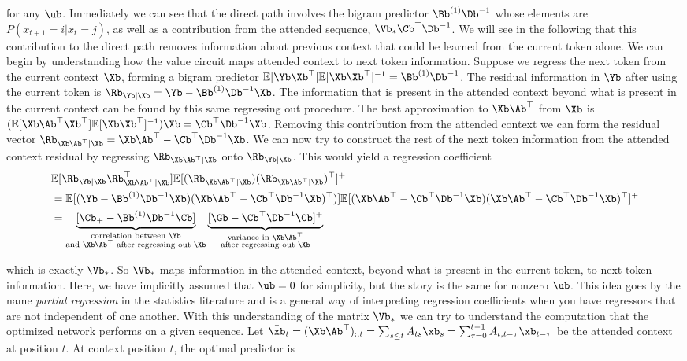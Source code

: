 \documentclass{article}
\begin{document}
for any $\ub$. Immediately we can see that the direct path involves the bigram predictor $\Bb^{(1)}\Db^{-1}$ whose elements are $P(x_{t+1} = i | x_t = j)$, as well as a contribution from the attended sequence, $\Vb_* \Cb^\top \Db^{-1}$. We will see in the following that this contribution to the direct path removes information about previous context that could be learned from the current token alone. We can begin by understanding how the value circuit maps attended context to next token information. Suppose we regress the next token from the current context $\Xb$, forming a bigram predictor $\mathbb{E}[\Yb\Xb^\top]\mathbb{E}[\Xb\Xb^\top]^{-1} = \Bb^{(1)}\Db^{-1}$. The residual information in $\Yb$ after using the current token is $\Rb_{\Yb|\Xb} = \Yb - \Bb^{(1)}\Db^{-1}\Xb$. The information that is present in the attended context beyond what is present in the current context can be found by this same regressing out procedure. The best approximation to $\Xb \Ab^\top$ from $\Xb$ is $(\mathbb{E}[\Xb\Ab^\top\Xb^\top]\mathbb{E}[\Xb\Xb^\top]^{-1})\Xb = \Cb^\top \Db^{-1}\Xb$. Removing this contribution from the attended context we can form the residual vector $\Rb_{\Xb \Ab^\top | \Xb} = \Xb\Ab^\top - \Cb^\top\Db^{-1}\Xb$. We can now try to construct the rest of the next token information from the attended context residual by regressing $\Rb_{\Xb \Ab^\top | \Xb}$ onto $\Rb_{\Yb|\Xb}$. This would yield a regression coefficient 
\begin{align}
    &\mathbb{E}[\Rb_{\Yb|\Xb}\Rb_{\Xb \Ab^\top | \Xb}^\top]\mathbb{E}[(\Rb_{\Xb \Ab^\top | \Xb})(\Rb_{\Xb \Ab^\top | \Xb})^\top]^{+}\\
    &= \mathbb{E}[(\Yb - \Bb^{(1)}\Db^{-1}\Xb)(\Xb\Ab^\top - \Cb^\top\Db^{-1}\Xb)^\top)]\mathbb{E}[(\Xb\Ab^\top - \Cb^\top\Db^{-1}\Xb)(\Xb\Ab^\top - \Cb^\top\Db^{-1}\Xb)^\top]^{+} \\
    &= \underbrace{[\Cb_+ - \Bb^{(1)}\Db^{-1}\Cb]}_{\substack{\textrm{correlation between $\Yb$} \\ \textrm{and $\Xb\Ab^\top$ after regressing out $\Xb$}}}\underbrace{[\Gb - \Cb^\top \Db^{-1}\Cb]^{+}}_{\substack{\textrm{variance in $\Xb\Ab^\top$} \\ \textrm{after regressing out $\Xb$}}}
\end{align}

which is exactly $\Vb_*$. So $\Vb_*$ maps information in the attended context, beyond what is present in the current token, to next token information. Here, we have implicitly assumed that $\ub = 0$ for simplicity, but the story is the same for nonzero $\ub$. This idea goes by the name \textit{partial regression} in the statistics literature and is a general way of interpreting regression coefficients when you have regressors that are not independent of one another. 
\newline
\newline
\newline
With this understanding of the matrix $\Vb_*$ we can try to understand the computation that the optimized network performs on a given sequence. Let $\bar{\xb}_t = (\Xb \Ab^\top)_{:,t} = \sum_{s\le t} A_{ts}\xb_s = \sum_{\tau=0}^{t-1} A_{t, t-\tau}\xb_{t-\tau}$ be the attended context at position $t$. At context position $t$, the optimal predictor is 
\end{document}
